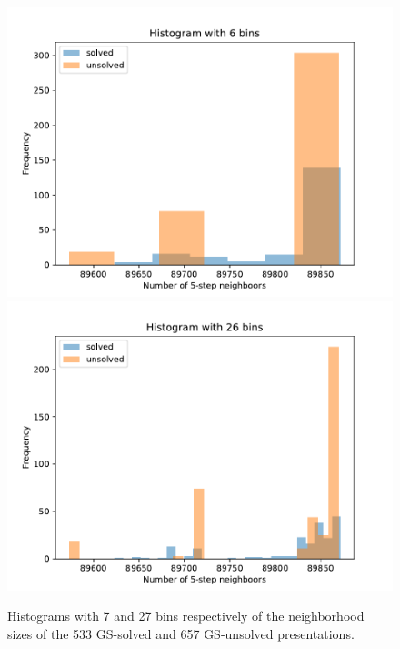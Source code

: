 \begin{figure}
	\centering
    \includegraphics[scale=.34]{fig/prime_histogram_rl.pdf}
	\includegraphics[scale=.34]{fig/prime_histogram_rl2.pdf}
	\caption{Histograms with 7 and 27 bins respectively of the neighborhood sizes of the 533 GS-solved and 657 GS-unsolved presentations.}
	\label{fig:prime_histogram}
\end{figure}